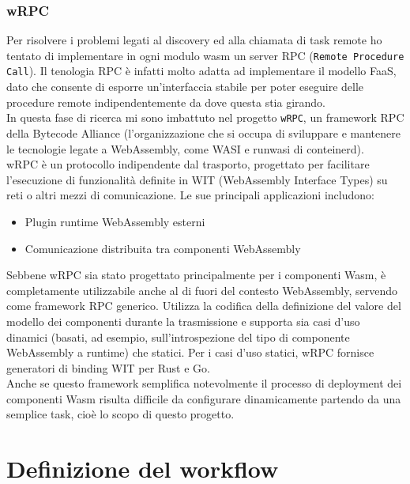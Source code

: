 \subsubsection{wRPC}
\label{sec:wrpc}

Per risolvere i problemi legati al discovery ed alla chiamata di task remote ho tentato di implementare in ogni modulo wasm un server RPC (\texttt{Remote Procedure Call}). Il tenologia RPC è infatti molto adatta ad implementare il modello FaaS, dato che consente di esporre un'interfaccia stabile per poter eseguire delle procedure remote indipendentemente da dove questa stia girando.\\
In questa fase di ricerca mi sono imbattuto nel progetto \texttt{wRPC}\cite{bytecodealliance_wrpc}, un framework RPC della Bytecode Alliance (l'organizzazione che si occupa di sviluppare e mantenere le tecnologie legate a WebAssembly, come WASI\cite{WASI2024} e runwasi\cite{containerd_runwasi} di conteinerd).\\
wRPC è un protocollo indipendente dal trasporto, progettato per facilitare l'esecuzione di funzionalità definite in WIT (WebAssembly Interface Types) su reti o altri mezzi di comunicazione. Le sue principali applicazioni includono:
\begin{itemize}
    \item Plugin runtime WebAssembly esterni
    \item Comunicazione distribuita tra componenti WebAssembly
\end{itemize}
Sebbene wRPC sia stato progettato principalmente per i componenti Wasm, è completamente utilizzabile anche al di fuori del contesto WebAssembly, servendo come framework RPC generico. Utilizza la codifica della definizione del valore del modello dei componenti durante la trasmissione e supporta sia casi d'uso dinamici (basati, ad esempio, sull'introspezione del tipo di componente WebAssembly a runtime) che statici. Per i casi d'uso statici, wRPC fornisce generatori di binding WIT per Rust e Go.\\
Anche se questo framework semplifica notevolmente il processo di deployment dei componenti Wasm risulta difficile da configurare dinamicamente partendo da una semplice task, cioè lo scopo di questo progetto.



\section{Definizione del workflow}

